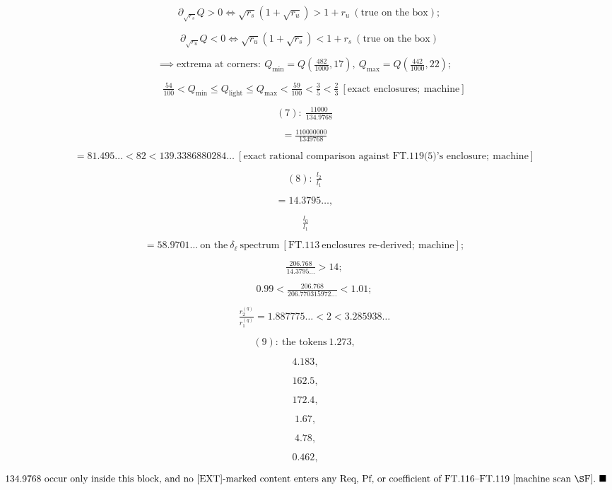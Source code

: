 \begin{theorem}
\[
\quad\partial_{\sqrt{r_s}}Q>0\iff\sqrt{r_s}(1+\sqrt{r_u})>1+r_u\ (\text{true on the box});
\]

\[
\quad\partial_{\sqrt{r_u}}Q<0\iff\sqrt{r_u}(1+\sqrt{r_s})<1+r_s\ (\text{true on the box})
\]

\[
\implies\text{extrema at corners}:\ Q_{\min}=Q(\tfrac{482}{1000},17),\ Q_{\max}=Q(\tfrac{442}{1000},22);
\]

\[
\qquad \tfrac{54}{100}<Q_{\min}\le Q_{\mathrm{light}}\le Q_{\max}<\tfrac{59}{100}<\tfrac35<\tfrac23\ [\text{exact enclosures};\ \text{machine}]
\]

\[
(7):\ \tfrac{11000}{134.9768}
\]

\[
= \tfrac{110000000}{1349768}
\]

\[
= 81.495\ldots<82<139.3386880284\ldots\ [\text{exact rational comparison against FT.119(5)'s enclosure};\ \text{machine}]
\]

\[
(8):\ \tfrac{l_2}{l_1}
\]

\[
= 14.3795\ldots,
\]

\[
\ \tfrac{l_0}{l_1}
\]

\[
= 58.9701\ldots\ \text{on the}\ \delta_\ell\ \text{spectrum}\ [\mathrm{FT.113}\ \text{enclosures re-derived};\ \text{machine}];
\]

\[
\qquad \tfrac{206.768}{14.3795\ldots}>14;
\]

\[
\qquad 0.99<\tfrac{206.768}{206.770315972\ldots}<1.01;
\]

\[
\qquad \tfrac{r^{(q)}_2}{r^{(q)}_1}=1.887775\ldots<2<3.285938\ldots
\]

\[
(9):\ \text{the tokens}\ 1.273,
\]

\[
\ 4.183,
\]

\[
\ 162.5,
\]

\[
\ 172.4,
\]

\[
\ 1.67,
\]

\[
\ 4.78,
\]

\[
\ 0.462,
\]

\[
\ 134.9768\ \text{occur only inside this block, and no [EXT]-marked content enters any Req, Pf, or coefficient of FT.116–FT.119}\ [\text{machine scan}\ \S\mathrm{F}].\ \blacksquare
\]


\end{theorem}
